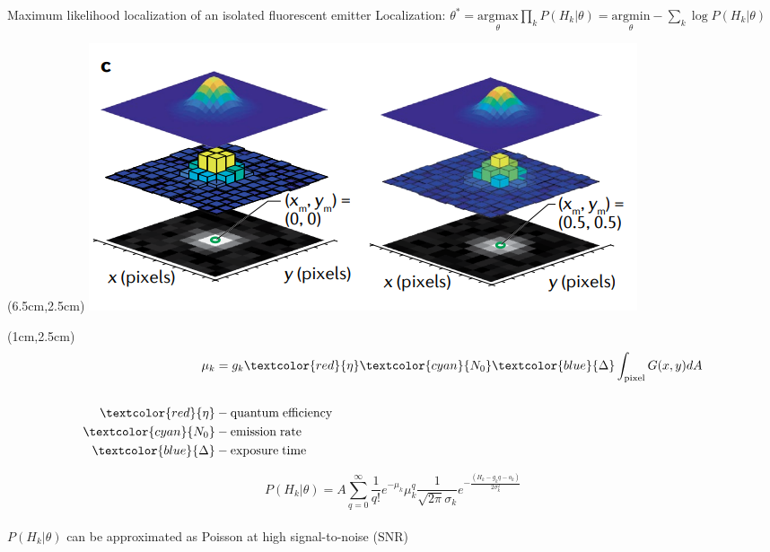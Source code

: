 \documentclass{beamer}					%
\begin{document}
\begin{frame}{Maximum likelihood localization of an isolated fluorescent emitter}
Localization: $\theta^{*} = \underset{\theta}{\mathrm{argmax}}\prod_{k}P(H_{k}|\theta)= \underset{\theta}{\mathrm{argmin}}-\sum_{k}\log P(H_{k}|\theta)$

\begin{textblock*}{8cm}(6.5cm,2.5cm)
\includegraphics[width=\textwidth]{Model.png}
\end{textblock*}

\begin{textblock*}{2cm}(1cm,2.5cm)
\begin{align*}
\mu_{k} &= g_{k}\textcolor{red}{\eta} \textcolor{cyan}{N_{0}}\textcolor{blue}{\Delta}\int_{\mathrm{pixel}} G(x,y)dA\\
\\
\textcolor{red}{\eta} &- \mathrm{quantum\; efficiency}\\
\textcolor{cyan}{N_{0}} &- \mathrm{emission\; rate}\\
\textcolor{blue}{\Delta} &- \mathrm{exposure\; time}
\end{align*}
\end{textblock*}


\vspace{2in}

\begin{equation*}
P(H_{k}|\theta) = A\sum_{q=0}^{\infty} \frac{1}{q!}e^{-\mu_{k}}\mu_{k}^{q}\frac{1}{\sqrt{2\pi}\sigma_{k}}e^{-\frac{(H_{k}-g_{k}q-o_{k})}{2\sigma_{k}^{2}}}
\end{equation*}
\\
$P(H_{k}|\theta)$ can be approximated as Poisson at high signal-to-noise ($\mathrm{SNR}$)

\end{frame}
\end{document}
